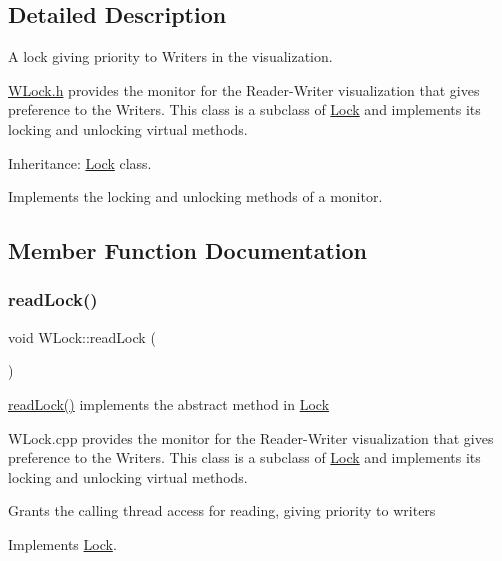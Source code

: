 \subsection{Detailed Description}
A lock giving priority to Writers in the visualization. 

\hyperlink{_w_lock_8h_source}{W\+Lock.\+h} provides the monitor for the Reader-\/\+Writer visualization that gives preference to the Writers. This class is a subclass of \hyperlink{class_lock}{Lock} and implements its locking and unlocking virtual methods.

Inheritance\+: \hyperlink{class_lock}{Lock} class.

Implements the locking and unlocking methods of a monitor. 

\subsection{Member Function Documentation}
\mbox{\label{class_w_lock_a9505de4121e181140291ac300885f9ef}} 
\subsubsection{\texorpdfstring{read\+Lock()}{readLock()}}
{\footnotesize\ttfamily void W\+Lock\+::read\+Lock (\begin{DoxyParamCaption}{ }\end{DoxyParamCaption})\hspace{0.3cm}{\ttfamily [virtual]}}



\hyperlink{class_w_lock_a9505de4121e181140291ac300885f9ef}{read\+Lock()} implements the abstract method in \hyperlink{class_lock}{Lock} 

W\+Lock.\+cpp provides the monitor for the Reader-\/\+Writer visualization that gives preference to the Writers. This class is a subclass of \hyperlink{class_lock}{Lock} and implements its locking and unlocking virtual methods.

Grants the calling thread access for reading, giving priority to writers 

Implements \hyperlink{class_lock}{Lock}.

\mbox{\label{class_w_lock_aaa017b4c3f8c3b8f0e5b43f80b9cad20}} 
